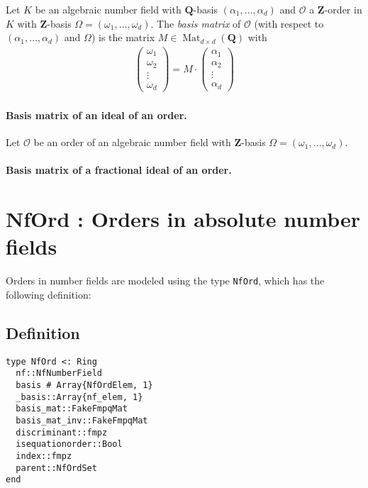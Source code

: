 \documentclass[a4paper,10pt]{article}
\newcommand{\Z}{\mathbf{Z}}
\newcommand{\Q}{\mathbf{Q}}
\newcommand{\code}{\lstinline}
\newcommand{\Mat}{\operatorname{Mat}}
\begin{document}
Let $K$ be an algebraic number field with $\Q$-basis $(\alpha_1,\dotsc,\alpha_d)$ and $\mathcal O$ a $\Z$-order in $K$ with $\Z$-basis $\Omega = (\omega_1,\dotsc,\omega_d)$.
The \textit{basis matrix} of $\mathcal O$ (with respect to $(\alpha_1,\dotsc,\alpha_d)$ and $\Omega$) is the matrix $M \in \Mat_{d \times d}(\Q)$ with
\begin{align*}
  \begin{pmatrix} \omega_1 \\ \omega_2 \\ \vdots \\ \omega_d \end{pmatrix} =
  M \cdot \begin{pmatrix} \alpha_1 \\ \alpha_2 \\ \vdots \\ \alpha_d \end{pmatrix}
\end{align*}

\paragraph{Basis matrix of an ideal of an order.}

Let $\mathcal O$ be an order of an algebraic number field with $\Z$-basis $\Omega = (\omega_1,\dotsc,\omega_d)$.

\paragraph{Basis matrix of a fractional ideal of an order.}

\section{NfOrd : Orders in absolute number fields}

Orders in number fields are modeled using the type \code{NfOrd}, which has the following definition:

\subsection{Definition}

\begin{lstlisting}
type NfOrd <: Ring             
  nf::NfNumberField              
  basis # Array{NfOrdElem, 1}  
  _basis::Array{nf_elem, 1}      
  basis_mat::FakeFmpqMat         
  basis_mat_inv::FakeFmpqMat     
  discriminant::fmpz             
  isequationorder::Bool          
  index::fmpz                
  parent::NfOrdSet 
end
\end{lstlisting}
\end{document}
